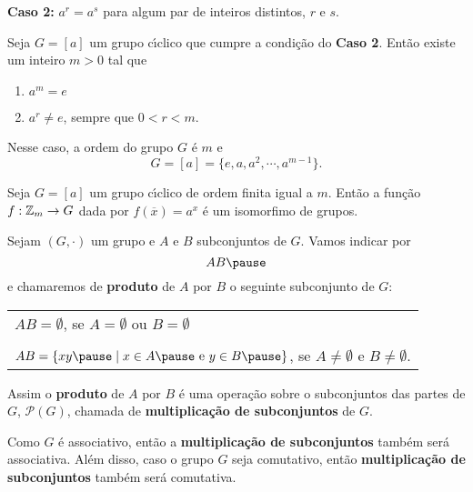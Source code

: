 \documentclass{beamer}
\begin{document}
    \begin{frame}
        \textbf{Caso 2:} $a^r = a^s$ \pause para algum par de inteiros distintos, $r$ e $s$.
    \end{frame}

    \begin{frame}
        \begin{proposicao}
            Seja $G = [a]$ um grupo c{\'\i}clico que cumpre a condição do \textbf{Caso 2}. \pause Então existe um inteiro $m > 0$ tal que \pause
            \begin{enumerate}
                \item[i)] $a^m = e$ \pause

                \item[ii)] $a^r \ne e$, sempre que $0 < r < m$. \pause
            \end{enumerate}
            Nesse caso, a ordem do grupo $G$ é $m$ \pause e
            \[
                G = [a] = \{e, a, a^2, \cdots, a^{m - 1}\}.
            \]
        \end{proposicao}
    \end{frame}

    \begin{frame}
        \begin{corolario}
            Seja $G = [a]$ um grupo c{\'\i}clico de ordem finita igual a $m$. \pause Então a função $f : \mathbb{Z}_m \to G$ \pause dada por $f(\overline{x}) = a^x$ \pause é um isomorfimo de grupos.
        \end{corolario}
    \end{frame}

    \begin{frame}
        Sejam $(G, \cdot)$ um grupo \pause e $A$ e $B$ subconjuntos de $G$. \pause Vamos indicar por \pause
        \[
            AB \pause
        \]
        e chamaremos de \textbf{produto} de $A$ por $B$ \pause o seguinte subconjunto de $G$: \pause
        \begin{center}
            \begin{tabular}{l}
                $AB = \emptyset$, \pause se $A = \emptyset$ ou $B = \emptyset$ \pause\\
                \\
                $AB = \{xy \pause \mid x \in A \pause \mbox{ e } y \in B \pause\}$, se  $A \ne \emptyset$ e $B \ne \emptyset$. \pause
            \end{tabular}
        \end{center}

        \vspace{.3cm}

        Assim o \textbf{produto} de $A$ por $B$ \pause é uma operação sobre o subconjuntos das partes de $G$, \pause $\mathcal{P}(G)$, chamada de \textbf{multiplicação de subconjuntos} de $G$. \pause

        \vspace{.3cm}

        Como $G$ é associativo, \pause então a \textbf{multiplicação de subconjuntos} também será associativa. \pause Além disso, caso o grupo $G$ seja comutativo, \pause então \textbf{multiplicação de subconjuntos} também será comutativa.
    \end{frame}
\end{document}
